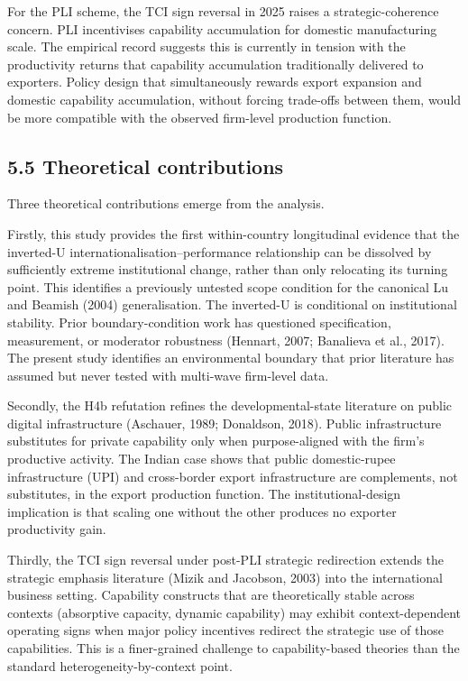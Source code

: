 \documentclass[
  12pt]{article}
\begin{document}
For the PLI scheme, the TCI sign reversal in 2025 raises a
strategic-coherence concern. PLI incentivises capability accumulation
for domestic manufacturing scale. The empirical record suggests this is
currently in tension with the productivity returns that capability
accumulation traditionally delivered to exporters. Policy design that
simultaneously rewards export expansion and domestic capability
accumulation, without forcing trade-offs between them, would be more
compatible with the observed firm-level production function.

\hypertarget{theoretical-contributions}{%
\subsection{5.5 Theoretical
contributions}\label{theoretical-contributions}}

Three theoretical contributions emerge from the analysis.

Firstly, this study provides the first within-country longitudinal
evidence that the inverted-U internationalisation--performance
relationship can be dissolved by sufficiently extreme institutional
change, rather than only relocating its turning point. This identifies a
previously untested scope condition for the canonical Lu and Beamish
(2004) generalisation. The inverted-U is conditional on institutional
stability. Prior boundary-condition work has questioned specification,
measurement, or moderator robustness (Hennart, 2007; Banalieva et al.,
2017). The present study identifies an environmental boundary that prior
literature has assumed but never tested with multi-wave firm-level data.

Secondly, the H4b refutation refines the developmental-state literature
on public digital infrastructure (Aschauer, 1989; Donaldson, 2018).
Public infrastructure substitutes for private capability only when
purpose-aligned with the firm's productive activity. The Indian case
shows that public domestic-rupee infrastructure (UPI) and cross-border
export infrastructure are complements, not substitutes, in the export
production function. The institutional-design implication is that
scaling one without the other produces no exporter productivity gain.

Thirdly, the TCI sign reversal under post-PLI strategic redirection
extends the strategic emphasis literature (Mizik and Jacobson, 2003)
into the international business setting. Capability constructs that are
theoretically stable across contexts (absorptive capacity, dynamic
capability) may exhibit context-dependent operating signs when major
policy incentives redirect the strategic use of those capabilities. This
is a finer-grained challenge to capability-based theories than the
standard heterogeneity-by-context point.
\end{document}
